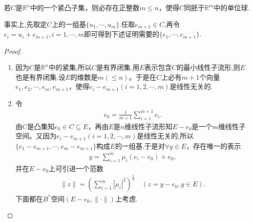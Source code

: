 \documentclass[../../main.tex]{subfiles}%
\begin{document}
\begin{corollary}\label{corollary:紧凸子集同胚单位球}
若$C$是$\mathbb{R}^n$中的一个紧凸子集，则必存在正整数$m \leqslant n$，使得$C$同胚于$\mathbb{R}^m$中的单位球.
\end{corollary}
\begin{note}
事实上,先取定$C$上的一组基$\{u_1,\cdots,u_m\}$.任取$e_{m+1}\in C$,再令$e_i=u_i+e_{m+1},i=1,\cdots,m$即可得到下述证明需要的$\{e_1,\cdots,e_{m+1}\}$.
\end{note}
\begin{proof}
\begin{enumerate}[(1)]
\item 因为$C$是$\mathbb{R}^n$中的紧集,所以$C$是有界闭集.用$E$表示包含$C$的最小线性子流形,则$E$也是有界闭集.设$E$的维数是$m(\leqslant n)$。于是在$C$上必有$m + 1$个向量$e_1, e_2, \cdots, e_m, e_{m+1}$，使得$e_i - e_{m+1}(i = 1, 2, \cdots, m)$是线性无关的.
\item 令
\begin{align*}
e_0 = \frac{1}{m + 1} \sum\limits_{i=1}^{m+1} e_i.
\end{align*}
由$C$是凸集知$e_0 \in C \subseteq E$，再由$E$是$n$维线性子流形知$E - e_0$是一个$m$维线性子空间。又因为$e_i - e_{m+1}(i = 1, 2, \cdots, m)$是线性无关的,所以$\{e_1-e_{m+1},\cdots,e_m-e_{m+1}\}$构成$E$的一组基.于是对$\forall y \in E$，存在唯一的表示
\begin{align}
y = \sum\limits_{i=1}^m \mu_i (e_i - e_0) + e_0, \label{eq:HJJIOu3fs1.5.5}
\end{align}
并在$E - e_0$上可引进一个范数
\begin{align*}
\|z\| = \left( \sum\limits_{i=1}^m |\mu_i|^2 \right)^{\frac{1}{2}} \quad (z = y - e_0, y \in E). 
\end{align*}
下面都在$B^*$空间$(E-e_0,\|\cdot\|)$上考虑.


\end{enumerate}
\end{proof}
\end{document}
